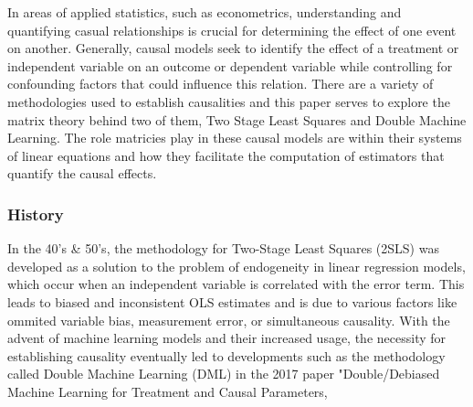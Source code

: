 In areas of applied statistics, such as econometrics, understanding and quantifying casual relationships is crucial for determining the effect of one event on another. Generally, causal models seek to identify the effect of a treatment or independent variable on an outcome or dependent variable while controlling for confounding factors that could influence this relation. There are a variety of methodologies used to establish causalities and this paper serves to explore the matrix theory behind two of them, Two Stage Least Squares and Double Machine Learning. The role matricies play in these causal models are within their systems of linear equations and how they facilitate the computation of estimators that quantify the causal effects. 
\subsubsection*{History}
In the 40's \& 50's, the methodology for Two-Stage Least Squares (2SLS) was developed as a solution to the problem of endogeneity in linear regression models, which occur when an independent variable is correlated with the error term. This leads to biased and inconsistent OLS estimates and is due to various factors like ommited variable bias, measurement error, or simultaneous causality. 
With the advent of machine learning models and their increased usage, the necessity for establishing causality eventually led to developments such as the methodology called Double Machine Learning (DML) in the 2017 paper "Double/Debiased Machine Learning for Treatment and Causal Parameters\cite{chernozhukov2017doubledebiasedmachinelearningtreatment},
